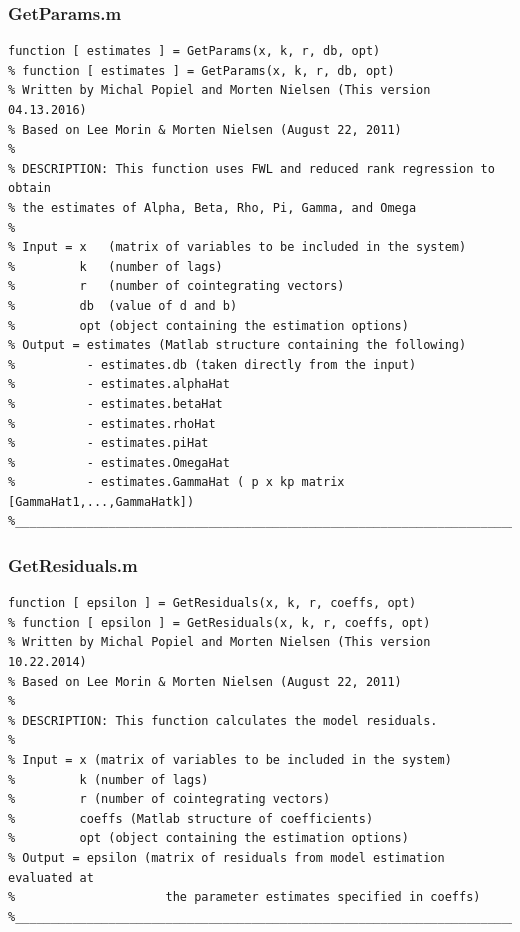 \documentclass[10pt]{article}
\begin{document}
\subsubsection{GetParams.m}
\begin{lstlisting}[frame=single,caption={GetParams.m}]
function [ estimates ] = GetParams(x, k, r, db, opt)
% function [ estimates ] = GetParams(x, k, r, db, opt)
% Written by Michal Popiel and Morten Nielsen (This version 04.13.2016)
% Based on Lee Morin & Morten Nielsen (August 22, 2011)
% 
% DESCRIPTION: This function uses FWL and reduced rank regression to obtain
% the estimates of Alpha, Beta, Rho, Pi, Gamma, and Omega
%
% Input = x   (matrix of variables to be included in the system)
%         k   (number of lags)
%         r   (number of cointegrating vectors)
%         db  (value of d and b)
%         opt (object containing the estimation options)
% Output = estimates (Matlab structure containing the following)
%          - estimates.db (taken directly from the input)
%          - estimates.alphaHat
%          - estimates.betaHat
%          - estimates.rhoHat
%          - estimates.piHat
%          - estimates.OmegaHat
%          - estimates.GammaHat ( p x kp matrix [GammaHat1,...,GammaHatk])
%_________________________________________________________________________
\end{lstlisting}

\subsubsection{GetResiduals.m}
\begin{lstlisting}[frame=single,caption={GetResiduals.m}]
function [ epsilon ] = GetResiduals(x, k, r, coeffs, opt)
% function [ epsilon ] = GetResiduals(x, k, r, coeffs, opt)
% Written by Michal Popiel and Morten Nielsen (This version 10.22.2014)
% Based on Lee Morin & Morten Nielsen (August 22, 2011)
% 
% DESCRIPTION: This function calculates the model residuals.
%
% Input = x (matrix of variables to be included in the system)
%         k (number of lags)
%         r (number of cointegrating vectors)
%         coeffs (Matlab structure of coefficients)
%         opt (object containing the estimation options)
% Output = epsilon (matrix of residuals from model estimation evaluated at
%                     the parameter estimates specified in coeffs) 
%_________________________________________________________________________
\end{lstlisting}
\end{document}
